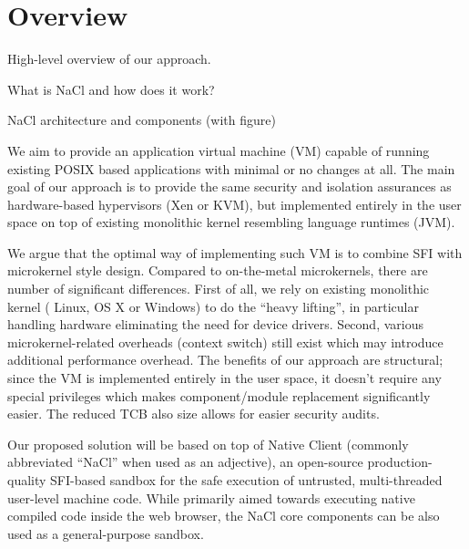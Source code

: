\section{Overview}
\label{sec:overview}

\begin{structure}
\item High-level overview of our approach.
\item What is NaCl and how does it work?
\item NaCl architecture and components (with figure)
\end{structure}


We aim to provide an application virtual machine (VM) capable of running
existing POSIX based applications with minimal or no changes at all. The
main goal of our approach is to provide the same security and isolation
assurances as hardware-based hypervisors (\eg Xen or KVM), but
implemented entirely in the user space on top of existing monolithic
kernel resembling language runtimes (\eg JVM).


We argue that the optimal way of implementing such VM is to combine SFI
with microkernel style design.
Compared to on-the-metal microkernels, there are number of significant
differences. First of all, we rely on existing monolithic kernel (\ie
Linux, OS X or Windows) to do the ``heavy lifting'', in particular
handling hardware eliminating the need for device drivers. Second,
various microkernel-related overheads (\eg context switch) still exist
which may introduce additional performance overhead. The benefits of our
approach are structural; since the VM is implemented entirely in the
user space, it doesn't require any special privileges which makes
component/module replacement significantly easier. The reduced TCB also
size allows for easier security audits.

Our proposed solution will be based on top of Native Client (commonly
abbreviated ``NaCl'' when used as an adjective), an open-source
production-quality SFI-based sandbox for the safe execution of
untrusted, multi-threaded user-level machine code. While primarily aimed
towards executing native compiled code inside the web browser, the NaCl
core components can be also used as a general-purpose sandbox.


